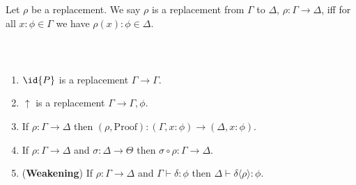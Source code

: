 
Let $\rho$ be a replacement.  We say $\rho$ is a replacement from $\Gamma$ to $\Delta$, $\rho : \Gamma \rightarrow \Delta$,
iff for all $x : \phi \in \Gamma$ we have $\rho(x) : \phi \in \Delta$.

\begin{code}%
\> \AgdaSymbol{:}  \AgdaSymbol{\{}\AgdaSymbol{\}} \AgdaSymbol{\{}\AgdaSymbol{\}}            \<%
\\
\>     \AgdaSymbol{=}     \AgdaSymbol{(} \AgdaSymbol{\{} \AgdaSymbol{=} \AgdaSymbol{\}} \AgdaSymbol{(} \AgdaSymbol{\_} \AgdaSymbol{)} \AgdaSymbol{)}   \AgdaSymbol{(}   \AgdaSymbol{)}\<%
\end{code}

\begin{lemma}$ $
\begin{enumerate}
\item
$\id{P}$ is a replacement $\Gamma \rightarrow \Gamma$.
\item
$\uparrow$ is a replacement $\Gamma \rightarrow \Gamma , \phi$.
\item
If $\rho : \Gamma \rightarrow \Delta$ then $(\rho , \mathrm{Proof}) : (\Gamma , x : \phi) \rightarrow (\Delta , x : \phi)$.
\item
If $\rho : \Gamma \rightarrow \Delta$ and $\sigma : \Delta \rightarrow \Theta$ then $\sigma \circ \rho : \Gamma \rightarrow \Delta$.
\item
(\textbf{Weakening})
If $\rho : \Gamma \rightarrow \Delta$ and $\Gamma \vdash \delta : \phi$ then $\Delta \vdash \delta \langle \rho \rangle : \phi$.
\end{enumerate}
\end{lemma}

